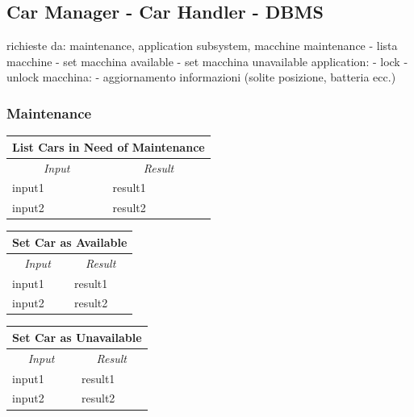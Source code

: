 \documentclass[english]{article}
\begin{document}
\subsection{Car Manager - Car Handler - DBMS}
richieste da: maintenance, application subsystem, macchine
maintenance
- lista macchine
- set macchina available
- set macchina unavailable
application:
- lock
- unlock
macchina:
- aggiornamento informazioni (solite posizione, batteria ecc.)

\subsubsection{Maintenance}
\begin{center}

	\begin{tabular}{ | p{6cm} | p{6cm} | }
		\hline 


		\hline

		\multicolumn{2}{|c|}{\textbf{List Cars in Need of Maintenance}} \\
		\hline
		\multicolumn{1}{|c|}{\textit{Input}} & \multicolumn{1}{c|}{\textit{Result}} \\
		\hline
		input1 & result1 \\
		\hline
		input2 & result2 \\
		\hline
	\end{tabular}
\end{center}

\begin{center}

	\begin{tabular}{ | p{6cm} | p{6cm} | }
		\hline 


		\hline

		\multicolumn{2}{|c|}{\textbf{Set Car as Available}} \\
		\hline
		\multicolumn{1}{|c|}{\textit{Input}} & \multicolumn{1}{c|}{\textit{Result}} \\
		\hline
		input1 & result1 \\
		\hline
		input2 & result2 \\
		\hline
	\end{tabular}
\end{center}

\begin{center}

	\begin{tabular}{ | p{6cm} | p{6cm} | }
		\hline 


		\hline

		\multicolumn{2}{|c|}{\textbf{Set Car as Unavailable}} \\
		\hline
		\multicolumn{1}{|c|}{\textit{Input}} & \multicolumn{1}{c|}{\textit{Result}} \\
		\hline
		input1 & result1 \\
		\hline
		input2 & result2 \\
		\hline
	\end{tabular}
\end{center}
\end{document}
